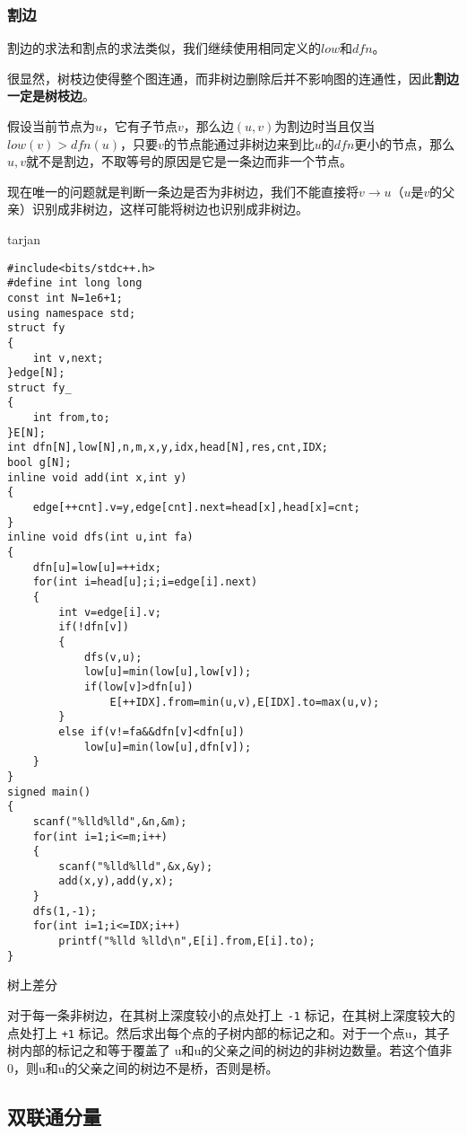 \documentclass[]{article}
\begin{document}
\hypertarget{ux5272ux8fb9}{%
\subsubsection{割边}\label{ux5272ux8fb9}}

割边的求法和割点的求法类似，我们继续使用相同定义的\(low\)和\(dfn\)。

很显然，树枝边使得整个图连通，而非树边删除后并不影响图的连通性，因此\textbf{割边一定是树枝边}。

假设当前节点为\(u\)，它有子节点\(v\)，那么边\((u,v)\)为割边时当且仅当\(low(v) > dfn(u)\)，只要\(v\)的节点能通过非树边来到比\(u\)的\(dfn\)更小的节点，那么\(u,v\)就不是割边，不取等号的原因是它是一条边而非一个节点。

现在唯一的问题就是判断一条边是否为非树边，我们不能直接将\(v \rightarrow u​\)（\(u​\)是\(v​\)的父亲）识别成非树边，这样可能将树边也识别成非树边。

tarjan

\begin{verbatim}
#include<bits/stdc++.h>
#define int long long
const int N=1e6+1;
using namespace std;
struct fy
{
    int v,next;
}edge[N];
struct fy_
{
    int from,to;
}E[N];
int dfn[N],low[N],n,m,x,y,idx,head[N],res,cnt,IDX;
bool g[N];
inline void add(int x,int y)
{
    edge[++cnt].v=y,edge[cnt].next=head[x],head[x]=cnt;
}
inline void dfs(int u,int fa)
{
    dfn[u]=low[u]=++idx;
    for(int i=head[u];i;i=edge[i].next)
    {
        int v=edge[i].v;
        if(!dfn[v])
        {
            dfs(v,u);
            low[u]=min(low[u],low[v]);
            if(low[v]>dfn[u])
                E[++IDX].from=min(u,v),E[IDX].to=max(u,v);
        }
        else if(v!=fa&&dfn[v]<dfn[u])
            low[u]=min(low[u],dfn[v]);
    }
}
signed main()
{
    scanf("%lld%lld",&n,&m);
    for(int i=1;i<=m;i++)
    {
        scanf("%lld%lld",&x,&y);
        add(x,y),add(y,x);
    }
    dfs(1,-1);
    for(int i=1;i<=IDX;i++)
        printf("%lld %lld\n",E[i].from,E[i].to);
}
\end{verbatim}

树上差分

对于每一条非树边，在其树上深度较小的点处打上 \texttt{-1}
标记，在其树上深度较大的点处打上 \texttt{+1}
标记。然后求出每个点的子树内部的标记之和。对于一个点u，其子树内部的标记之和等于覆盖了
u和u的父亲之间的树边的非树边数量。若这个值非0，则u和u的父亲之间的树边不是桥，否则是桥。

\hypertarget{ux53ccux8054ux901aux5206ux91cf}{%
\subsection{双联通分量}\label{ux53ccux8054ux901aux5206ux91cf}}
\end{document}
